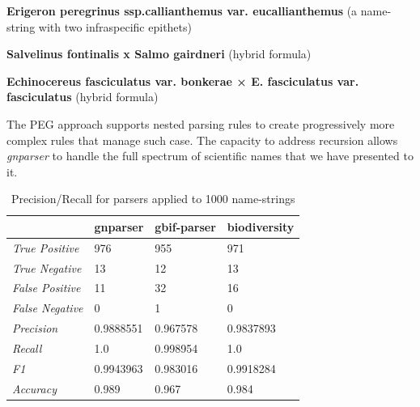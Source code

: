 \documentclass{bmcart}
\begin{document}
   \textbf{ Erigeron peregrinus ssp.callianthemus var. eucallianthemus} (a name-string with two infraspecific epithets)
      
   \textbf{ Salvelinus fontinalis x Salmo gairdneri} (hybrid formula)
   
   \textbf{ Echinocereus fasciculatus var. bonkerae × E. fasciculatus var. fasciculatus} (hybrid formula)


\vspace{0.5cm}

The PEG approach supports nested parsing rules to create progressively more complex rules that manage such case. The capacity to address recursion allows \textit{gnparser} to handle the full spectrum of scientific names that we have presented to it.

\begin{table}[htb]
  \begin{center}
    \caption{Precision/Recall for parsers applied to 1000
    name-strings}\label{table:precision}
    \resizebox{10cm}{!} {\begin{tabular}{|l|*{3}{l}|}
      \hline
                             & gnparser & gbif-parser & biodiversity \\
      \hline
      \textit{True Positive} & 976      & 955         & 971          \\
      \textit{True Negative} & 13       & 12          & 13           \\
      \textit{False Positive}& 11       & 32          & 16           \\
      \textit{False Negative}& 0        & 1           & 0            \\
      \textit{Precision}     & 0.9888551& 0.967578    & 0.9837893    \\
      \textit{Recall}        & 1.0      & 0.998954    & 1.0          \\
      \textit{F1}            & 0.9943963& 0.983016    & 0.9918284    \\
      \textit{Accuracy}      & 0.989    & 0.967       & 0.984        \\
      \hline
    \end{tabular}
    }
  \end{center}
\end{table}
\end{document}
